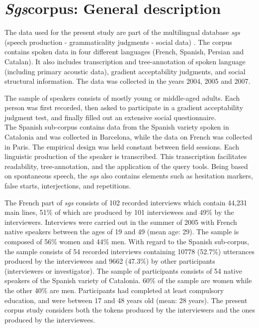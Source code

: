 \section{\textit{Sgs}corpus: General description}

The data used for the present study are part of the multilingual database \textit{sgs} (speech production - grammaticality judgments - social data) \parencite{adli2011gradient}. The corpus contains spoken data in four different languages (French, Spanish, Persian and Catalan). It also includes transcription and tree-annotation of spoken language (including primary acoustic data), gradient acceptability judgments, and social structural information. The data was collected in the years 2004, 2005 and 2007. 

The sample of speakers consists of mostly young or middle-aged adults. Each person was first recorded, then asked to participate in a gradient acceptability judgment test, and finally filled out an extensive social questionnaire.\\
The Spanish sub-corpus contains data from the Spanish variety spoken in Catalonia and  was collected in Barcelona, while the data on French was collected in Paris. The empirical design was held constant between field sessions. Each linguistic production of the speaker is transcribed. This transcription facilitates  readability, tree-annotation, and the application of the query tools. Being based on spontaneous speech, the \textit{sgs} also contains elements such as hesitation markers, false starts, interjections, and repetitions. 

The French part of \textit{sgs} consists of 102 recorded interviews which contain 44,231 main lines, 51\% of which are produced by 101 interviewees and 49\% by the interviewers. Interviews were carried out in the summer of 2005 with French native speakers between the ages of 19 and 49 (mean age: 29). The sample is composed of 56\% women and 44\% men. 
With regard to the Spanish sub-corpus, the sample consists of 54 recorded interviews containing 10778 (52.7\%) utterances produced by the interviewees and 9662 (47.3\%) by other participants (interviewers or investigator). The sample of participants consists of 54 native speakers of the Spanish variety of Catalonia. 60\% of the sample are women while the other 40\% are men. Participants had completed at least compulsory education, and were between 17 and 48 years old (mean: 28 years). 
The present corpus study considers both the tokens produced by the interviewers and the ones produced by the interviewees.


